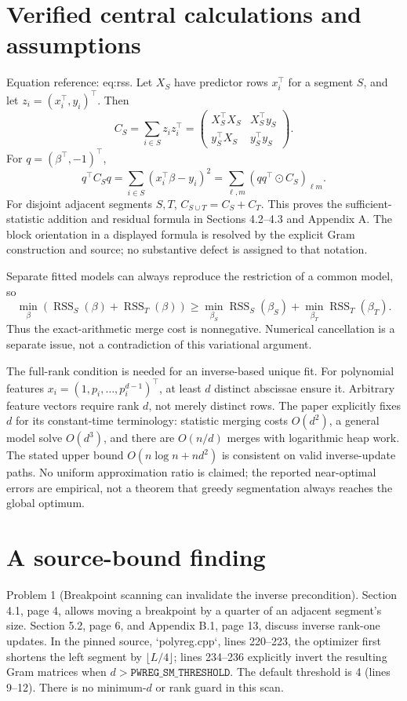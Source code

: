 \documentclass[10pt]{article}
\begin{document}
\section*{Verified central calculations and assumptions}
Equation reference: eq:rss. Let \(X_S\) have predictor rows \(x_i^\top\) for a segment \(S\), and let \(z_i=(x_i^\top,y_i)^\top\). Then \[C_S=\sum_{i\in S}z_i z_i^\top
 =\begin{pmatrix}X_S^\top X_S&X_S^\top y_S\\
 y_S^\top X_S&y_S^\top y_S\end{pmatrix}.\] For \(q=(\beta^\top,-1)^\top\), \[
 q^\top C_Sq
 =\sum_{i\in S}(x_i^\top\beta-y_i)^2
 =\sum_{\ell,m}(qq^\top\odot C_S)_{\ell m}.\] For disjoint adjacent segments \(S,T\), \(C_{S\cup T}=C_S+C_T\). This proves the sufficient-statistic addition and residual formula in Sections 4.2–4.3 and Appendix A. The block orientation in a displayed formula is resolved by the explicit Gram construction and source; no substantive defect is assigned to that notation.\par
Separate fitted models can always reproduce the restriction of a common model, so \[\min_\beta(\operatorname{RSS}_S(\beta)+\operatorname{RSS}_T(\beta))
 \geq \min_{\beta_S}\operatorname{RSS}_S(\beta_S)
     +\min_{\beta_T}\operatorname{RSS}_T(\beta_T).\] Thus the exact-arithmetic merge cost is nonnegative. Numerical cancellation is a separate issue, not a contradiction of this variational argument.\par
The full-rank condition is needed for an inverse-based unique fit. For polynomial features \(x_i=(1,p_i,\ldots,p_i^{d-1})^\top\), at least \(d\) distinct abscissae ensure it. Arbitrary feature vectors require rank \(d\), not merely distinct rows. The paper explicitly fixes \(d\) for its constant-time terminology: statistic merging costs \(O(d^2)\), a general model solve \(O(d^3)\), and there are \(O(n/d)\) merges with logarithmic heap work. The stated upper bound \(O(n\log n+nd^2)\) is consistent on valid inverse-update paths. No uniform approximation ratio is claimed; the reported near-optimal errors are empirical, not a theorem that greedy segmentation always reaches the global optimum.\par
\section*{A source-bound finding}
Problem 1 (Breakpoint scanning can invalidate the inverse precondition).  Section 4.1, page 4, allows moving a breakpoint by a quarter of an adjacent segment’s size. Section 5.2, page 6, and Appendix B.1, page 13, discuss inverse rank-one updates. In the pinned source, `polyreg.cpp`, lines 220–223, the optimizer first shortens the left segment by \(\lfloor L/4\rfloor\); lines 234–236 explicitly invert the resulting Gram matrices when \(d>\texttt{PWREG\_SM\_THRESHOLD}\). The default threshold is 4 (lines 9–12). There is no minimum-\(d\) or rank guard in this scan.\par
\end{document}
